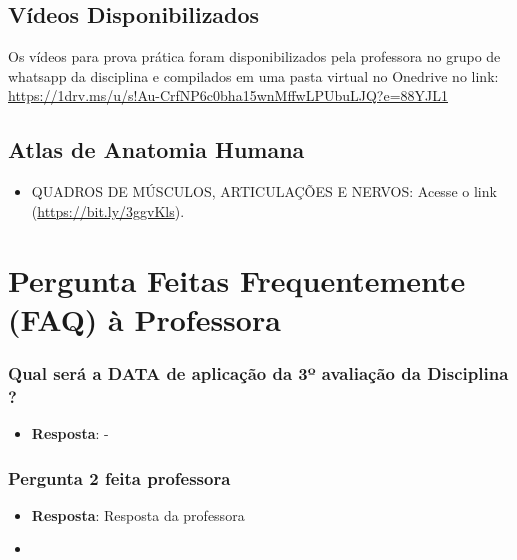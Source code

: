 \documentclass[
]{book}
\providecommand{\tightlist}{%
  \setlength{\itemsep}{0pt}\setlength{\parskip}{0pt}}
\begin{document}
\hypertarget{vuxeddeos-disponibilizados}{%
\section{Vídeos Disponibilizados}\label{vuxeddeos-disponibilizados}}

Os vídeos para prova prática foram disponibilizados pela professora no grupo de whatsapp da disciplina e compilados em uma pasta virtual no Onedrive no link: \url{https://1drv.ms/u/s!Au-CrfNP6c0bha15wnMffwLPUbuLJQ?e=88YJL1}

\hypertarget{atlas-de-anatomia-humana}{%
\section{Atlas de Anatomia Humana}\label{atlas-de-anatomia-humana}}

\begin{itemize}
\tightlist
\item
  QUADROS DE MÚSCULOS, ARTICULAÇÕES E NERVOS: Acesse o link (\url{https://bit.ly/3ggvKls}).
\end{itemize}

\hypertarget{pergunta-feitas-frequentemente-faq-uxe0-professora}{%
\chapter{Pergunta Feitas Frequentemente (FAQ) à Professora}\label{pergunta-feitas-frequentemente-faq-uxe0-professora}}

\hypertarget{qual-seruxe1-a-data-de-aplicauxe7uxe3o-da-3uxba-avaliauxe7uxe3o-da-disciplina}{%
\subsection{Qual será a DATA de aplicação da 3º avaliação da Disciplina ?}\label{qual-seruxe1-a-data-de-aplicauxe7uxe3o-da-3uxba-avaliauxe7uxe3o-da-disciplina}}

\begin{itemize}
\tightlist
\item
  \textbf{Resposta}: -
\end{itemize}

\hypertarget{pergunta-2-feita-professora}{%
\subsection{Pergunta 2 feita professora}\label{pergunta-2-feita-professora}}

\begin{itemize}
\tightlist
\item
  \textbf{Resposta}: Resposta da professora
\end{itemize}

\begin{itemize}
\tightlist
\item
\end{itemize}

  
\end{document}
